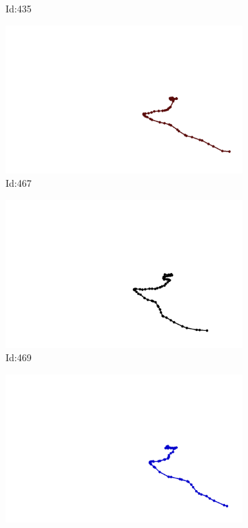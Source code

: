 \documentclass[12pt,twoside]{report}
\begin{document}
\begin{figure}
\begin{subfigure}[b]{0.20\textwidth}
\caption{Id:435}
\end{subfigure}
\begin{subfigure}[b]{0.20\textwidth}
\centering
\includegraphics[width=\textwidth]{../trajectories/467.png}
\caption{Id:467}
\end{subfigure}
\begin{subfigure}[b]{0.20\textwidth}
\centering
\includegraphics[width=\textwidth]{../trajectories/469.png}
\caption{Id:469}
\end{subfigure}
\begin{subfigure}[b]{0.20\textwidth}
\centering
\includegraphics[width=\textwidth]{../trajectories/487.png}

\end{subfigure}
\end{figure}
\end{document}

